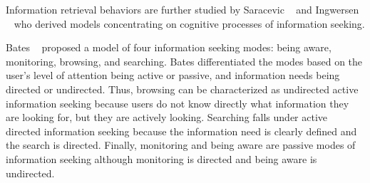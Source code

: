 {Information retrieval behaviors are further studied by Saracevic ~\cite{saracevic} and Ingwersen ~\cite{ingwersen} who derived models concentrating on cognitive processes of information seeking. 
 
Bates ~\cite{bates1986} proposed a model of four information seeking modes: being aware, monitoring, browsing, and searching. Bates differentiated the modes based on the user's level of attention being active or passive, and information needs being directed or undirected. Thus, browsing can be characterized as undirected active information seeking because users do not know directly what information they are looking for, but they are actively looking. Searching falls under active directed information seeking because the information need is clearly defined and the search is directed. Finally, monitoring and being aware are passive modes of information seeking although monitoring is directed and being aware is undirected.

} %
   
